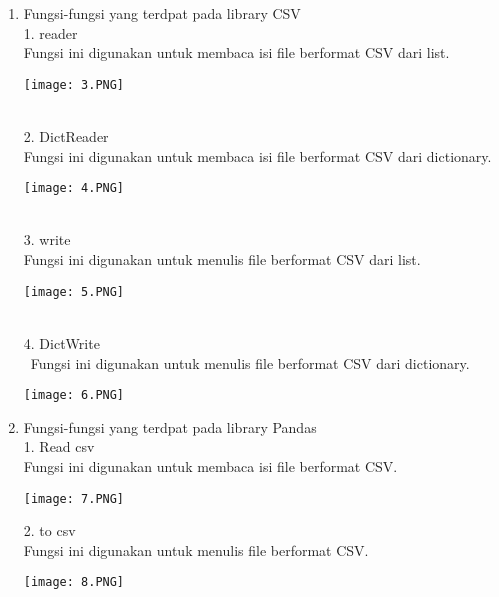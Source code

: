 \documentclass{article}
\begin{document}
\begin{enumerate}
     \item Fungsi-fungsi yang terdpat pada library CSV\\
     1.  reader\\
        Fungsi ini digunakan untuk membaca isi ﬁle berformat CSV dari list.\\
        \begin{center}
    \texttt{[image: 3.PNG]}
    \end{center}
    \\
    2. DictReader\\
        Fungsi ini digunakan untuk membaca isi ﬁle berformat CSV dari dictionary.\\
        \begin{center}
    \texttt{[image: 4.PNG]}
    \end{center}
    \\
    3.  write\\
        Fungsi ini digunakan untuk menulis ﬁle berformat CSV dari list.\\
         \begin{center}
    \texttt{[image: 5.PNG]}
    \end{center}
    \\
    4. DictWrite\\\
    Fungsi ini digunakan untuk menulis ﬁle berformat CSV dari dictionary.\\
    \begin{center}
    \texttt{[image: 6.PNG]}
    \end{center}
    
   \item Fungsi-fungsi yang terdpat pada library Pandas\\
   1.  Read csv\\
   Fungsi ini digunakan untuk membaca isi ﬁle berformat CSV.\\
   \begin{center}
    \texttt{[image: 7.PNG]}
    \end{center}
    
    2.  to csv\\
    Fungsi ini digunakan untuk menulis ﬁle berformat CSV.\\
    \begin{center}
    \texttt{[image: 8.PNG]}
    \end{center}
\end{enumerate}
\end{document}
